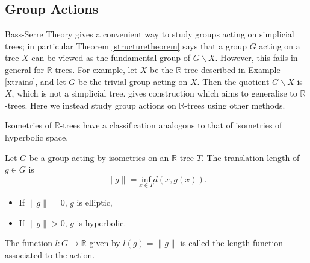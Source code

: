 \subsection{Group Actions}
Bass-Serre Theory gives a convenient way to study groups acting on simplicial trees; in particular Theorem \ref{structuretheorem} says that a group $G$ acting on a tree $X$ can be viewed as the fundamental group of $G\backslash X$. However, this fails in general for $\mathbb{R}$-trees. For example, let $X$ be the $\mathbb{R}$-tree described in Example \ref{xtrains}, and let $G$ be the trivial group acting on $X$. Then the quotient $G\backslash X$ is $X$, which is not a simplicial tree. \cite{Levit_rtrees} gives construction which aims to generalise to $\mathbb{R}$-trees. Here we instead study group actions on $\mathbb{R}$-trees using other methods.

Isometries of $\mathbb{R}$-trees have a classification analogous to that of isometries of hyperbolic space. 
\begin{definition}
    Let $G$ be a group acting by isometries on an $\mathbb{R}$-tree $T$. The \textnormal{translation length} of $g\in G$ is \[\lVert g\rVert=\underset{x\in T}{\text{inf}}d(x,g(x)).\]
    \begin{itemize}
        \item If $\lVert g\rVert=0$, $g$ is \textnormal{elliptic},
        \item If $\lVert g\rVert>0$, $g$ is \textnormal{hyperbolic}.
    \end{itemize}
    The function $l:G\rightarrow\mathbb{R}$ given by $l(g)=\lVert g\rVert$ is called the \textnormal{length function} associated to the action.
\end{definition}

